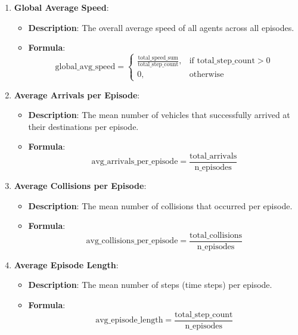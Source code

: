 \begin{enumerate}
    \item \textbf{Global Average Speed}:
    \begin{itemize}
        \item \textbf{Description}: The overall average speed of all agents across all episodes.
        \item \textbf{Formula}:
        \[
        \text{global\_avg\_speed} =
        \begin{cases}
        \frac{\text{total\_speed\_sum}}{\text{total\_step\_count}}, & \text{if } \text{total\_step\_count} > 0 \\
        0, & \text{otherwise}
        \end{cases}
        \]
    \end{itemize}
    
    \item \textbf{Average Arrivals per Episode}:
    \begin{itemize}
        \item \textbf{Description}: The mean number of vehicles that successfully arrived at their destinations per episode.
        \item \textbf{Formula}:
        \[
        \text{avg\_arrivals\_per\_episode} = \frac{\text{total\_arrivals}}{\text{n\_episodes}}
        \]
    \end{itemize}
    
    \item \textbf{Average Collisions per Episode}:
    \begin{itemize}
        \item \textbf{Description}: The mean number of collisions that occurred per episode.
        \item \textbf{Formula}:
        \[
        \text{avg\_collisions\_per\_episode} = \frac{\text{total\_collisions}}{\text{n\_episodes}}
        \]
    \end{itemize}
    
    \item \textbf{Average Episode Length}:
    \begin{itemize}
        \item \textbf{Description}: The mean number of steps (time steps) per episode.
        \item \textbf{Formula}:
        \[
        \text{avg\_episode\_length} = \frac{\text{total\_step\_count}}{\text{n\_episodes}}
        \]
    \end{itemize}
\end{enumerate}

